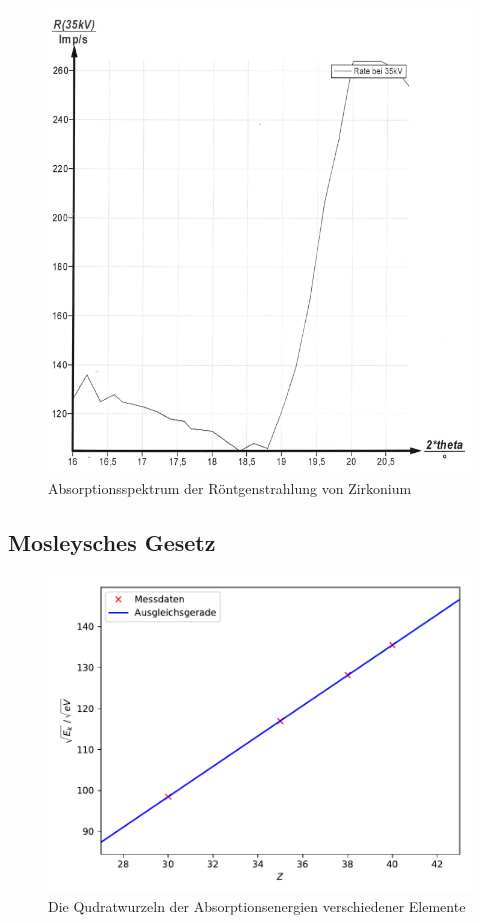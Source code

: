 \begin{figure}[H]
  \centering
  \includegraphics[scale=0.3]{content/bild4.png}
  \caption{Absorptionsspektrum der Röntgenstrahlung von Zirkonium}
  \label{fig:plot6}
\end{figure}

\subsection{Mosleysches Gesetz}

\begin{figure}[H]
  \centering
  \includegraphics[scale=0.7]{content/plot1.pdf}
  \caption{Die Qudratwurzeln der Absorptionsenergien verschiedener Elemente}
  \label{fig:plotx}
\end{figure}

